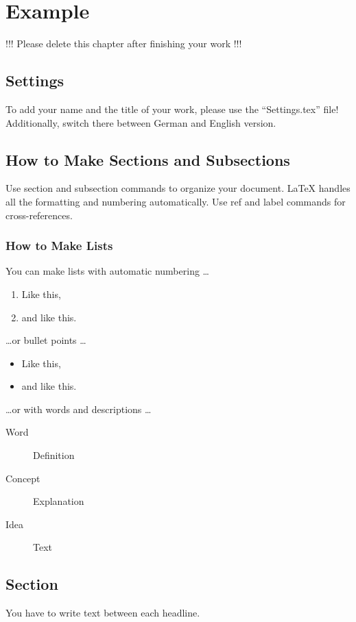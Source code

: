 \chapter{Example}
\label{ch:example}

!!! Please delete this chapter after finishing your work !!!

\section{Settings}

To add your name and the title of your work, please use the ``Settings.tex'' file!
Additionally, switch there between German and English version.

\section{How to Make Sections and Subsections}

Use section and subsection commands to organize your document. \LaTeX{} handles all the formatting and numbering automatically. Use ref and label commands for cross-references.

\subsection{How to Make Lists}

You can make lists with automatic numbering \dots

\begin{enumerate}
\item Like this,
\item and like this.
\end{enumerate}
\dots or bullet points \dots
\begin{itemize}
\item Like this,
\item and like this.
\end{itemize}
\dots or with words and descriptions \dots
\begin{description}
\item[Word] Definition
\item[Concept] Explanation
\item[Idea] Text
\end{description}\section{Section}

You have to write text between each headline.

